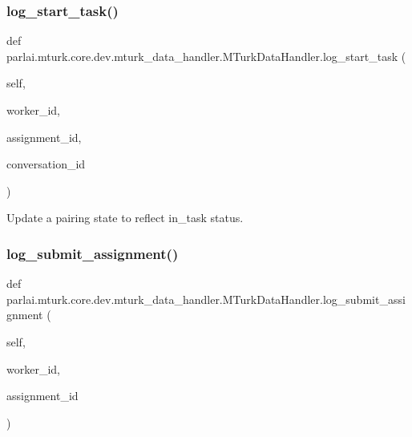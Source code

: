 \subsubsection{\texorpdfstring{log\+\_\+start\+\_\+task()}{log\_start\_task()}}
{\footnotesize\ttfamily def parlai.\+mturk.\+core.\+dev.\+mturk\+\_\+data\+\_\+handler.\+M\+Turk\+Data\+Handler.\+log\+\_\+start\+\_\+task (\begin{DoxyParamCaption}\item[{}]{self,  }\item[{}]{worker\+\_\+id,  }\item[{}]{assignment\+\_\+id,  }\item[{}]{conversation\+\_\+id }\end{DoxyParamCaption})}

\begin{DoxyVerb}Update a pairing state to reflect in_task status.
\end{DoxyVerb}
 \mbox{\label{classparlai_1_1mturk_1_1core_1_1dev_1_1mturk__data__handler_1_1MTurkDataHandler_a5a9a1246250044f6f13117c899285c82}} 
\subsubsection{\texorpdfstring{log\+\_\+submit\+\_\+assignment()}{log\_submit\_assignment()}}
{\footnotesize\ttfamily def parlai.\+mturk.\+core.\+dev.\+mturk\+\_\+data\+\_\+handler.\+M\+Turk\+Data\+Handler.\+log\+\_\+submit\+\_\+assignment (\begin{DoxyParamCaption}\item[{}]{self,  }\item[{}]{worker\+\_\+id,  }\item[{}]{assignment\+\_\+id }\end{DoxyParamCaption})}

